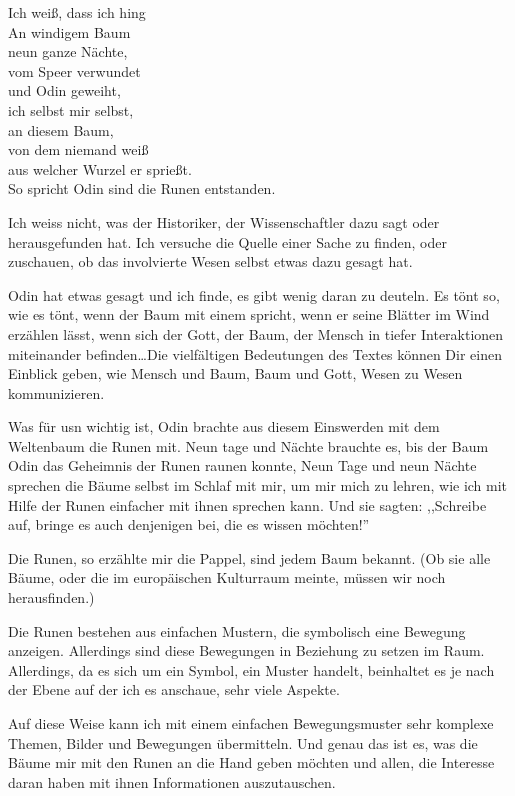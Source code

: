 \documentclass[11pt,titlepage,a5paper]{book}
\begin{document}
Ich weiß, dass ich hing\\
An windigem Baum\\
neun ganze Nächte,\\
vom Speer verwundet\\
und Odin geweiht,\\
ich selbst mir selbst,\\
an diesem Baum,\\
von dem niemand weiß\\
aus welcher Wurzel er sprießt.\\

So spricht Odin sind die Runen entstanden.

Ich weiss nicht, was der Historiker, der Wissenschaftler dazu sagt oder herausgefunden hat. Ich versuche die Quelle einer Sache zu finden, oder zuschauen, ob das involvierte Wesen selbst etwas dazu gesagt hat. 

Odin hat etwas gesagt und ich finde, es gibt wenig daran zu deuteln. Es tönt so, wie es tönt, wenn der Baum mit einem spricht, wenn er seine Blätter im Wind erzählen lässt, wenn sich der Gott, der Baum, der Mensch in tiefer Interaktionen miteinander befinden\dots Die vielfältigen Bedeutungen des Textes können Dir einen Einblick geben, wie Mensch und Baum, Baum und Gott, Wesen zu Wesen kommunizieren.

Was für usn wichtig ist, Odin brachte aus diesem Einswerden mit dem Weltenbaum die Runen mit. Neun tage und Nächte brauchte es, bis der Baum Odin das Geheimnis der Runen raunen konnte, Neun Tage und neun Nächte sprechen die Bäume selbst im Schlaf mit mir, um mir mich zu lehren, wie ich mit Hilfe der Runen einfacher mit ihnen sprechen kann. Und sie sagten: ,,Schreibe auf, bringe es auch denjenigen bei, die es wissen möchten!''

Die Runen, so erzählte mir die Pappel, sind jedem Baum bekannt. (Ob sie alle Bäume, oder die im europäischen Kulturraum meinte, müssen wir noch herausfinden.)

Die Runen bestehen aus einfachen Mustern, die symbolisch eine Bewegung anzeigen. Allerdings sind diese Bewegungen in Beziehung zu setzen im Raum. Allerdings, da es sich um ein Symbol, ein Muster handelt, beinhaltet es je nach der Ebene auf der ich es anschaue, sehr viele Aspekte.

Auf diese Weise kann ich mit einem einfachen Bewegungsmuster sehr komplexe Themen, Bilder und Bewegungen übermitteln. Und genau das ist es, was die Bäume mir mit den Runen an die Hand geben möchten und allen, die Interesse daran haben mit ihnen Informationen auszutauschen.
\end{document}
